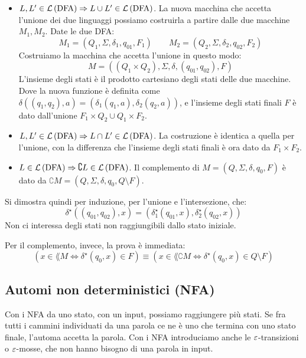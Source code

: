 \begin{itemize}
	\item $L, L' \in \mathcal{L}\left( {\text{DFA}} \right) \Rightarrow L \cup L' \in \mathcal{L}\left( {\text{DFA}} \right)$.
		La nuova macchina che accetta l'unione dei due linguaggi possiamo costruirla a partire dalle due macchine $M_1, M_2$.
		Date le due DFA:
		\[
			M_1 = (Q_1, \Sigma, \delta_1, q_{01}, F_1) \qquad M_2 = (Q_2, \Sigma, \delta_2, q_{02}, F_2)
		\]
		Costruiamo la macchina che accetta l'unione in questo modo:
		\[
			M = \left( (Q_1 \times Q_2), \Sigma, \delta, (q_{01}, q_{02}), F \right)
		\]
		L'insieme degli stati \`e il prodotto cartesiano degli stati delle due macchine.
		Dove la nuova funzione \`e definita come $\delta \left( (q_1, q_2), a \right) = \left( \delta_1(q_1, a), \delta_2(q_2, a) \right)$, e l'insieme degli stati finali $F$ \`e dato dall'unione $F_1 \times Q_2 \cup Q_1 \times F_2$.
	\item $L, L' \in \mathcal{L}\left( {\text{DFA}} \right) \Rightarrow L \cap L' \in \mathcal{L}\left( {\text{DFA}} \right)$.
		La costruzione \`e identica a quella per l'unione, con la differenza che l'insieme degli stati finali \`e ora dato da $F_1 \times F_2$.
	\item $L \in \mathcal{L}\left( {\text{DFA}} \right) \Rightarrow \complement L \in \mathcal{L}\left( {\text{DFA}} \right)$.
		Il complemento di $M = (Q, \Sigma, \delta, q_0, F)$ \`e dato da $\complement M = (Q, \Sigma, \delta, q_0, Q \setminus F)$.
\end{itemize}

Si dimostra quindi per induzione, per l'unione e l'intersezione, che:
\[
	\delta^{\star} \left( ( q_{01}, q_{02}), x \right) = \left( \delta_1^{\star} (q_{01}, x), \delta_2^{\star} (q_{02}, x) \right)
\]
Non ci interessa degli stati non raggiungibili dallo stato iniziale.

Per il complemento, invece, la prova \`e immediata:
\[
	\left( x \in \lang{M} \iff \delta^{\star} (q_0, x) \in F \right) \equiv \left( x \in \lang{\complement M} \iff \delta^{\star} (q_0, x) \in Q \setminus F \right)
\]

\subsection{Automi non deterministici (NFA)}

Con i NFA da uno stato, con un input, possiamo raggiungere pi\`u stati.
Se fra tutti i cammini individuati da una parola ce ne \`e uno che termina con uno stato finale, l'automa accetta la parola.
Con i NFA introduciamo anche le $\varepsilon$-transizioni o $\varepsilon$-mosse, che non hanno bisogno di una parola in input.

